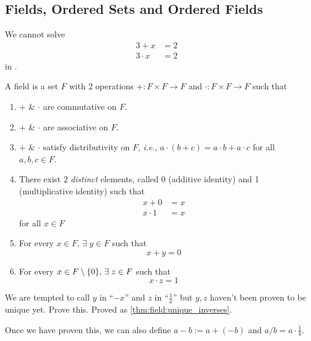 \subsection{Fields, Ordered Sets and Ordered Fields}
We cannot solve
\begin{align*}
    3 + x &= 2 \\
    3 \cdot x &= 2
\end{align*}
\hfill in \N.

\begin{defn} \label{defn:field}
    A field is a set $F$ with 2 operations $+ : F \times F \to F$ and $\cdot : F \times F \to F$ such that
    \begin{enumerate}[label=(F\arabic*)]
        \item \label{defn:field:commutativity}
            $+$ \& $\cdot$ are commutative on $F$.
        \item \label{defn:field:associativity}
            $+$ \& $\cdot$ are associative on $F$.
        \item \label{defn:field:distributivity}
            $+$ \& $\cdot$ satisfy distributivity on $F$, \textit{i.e.}, $a \cdot (b + c) = a \cdot b + a \cdot c$ for all $a, b, c \in F$. 
        \item \label{defn:field:identity}
            There exist 2 \emph{distinct} elements, called 0 (additive identity) and 1 (multiplicative identity) such that
            \begin{align*}
                x + 0 &= x \\
                x \cdot 1 &= x
            \end{align*}
            for all $x \in F$
        \item \label{defn:field:negative}
            For every $x \in F, \,\exists\; y \in F$ such that \[
                x + y = 0
            \]
        \item \label{defn:field:reciprocal}
            For every $x \in F \setminus \set{0}, \,\exists\; z \in F$ such that \[
                x \cdot z = 1
            \]
    \end{enumerate}
\end{defn}
\begin{rem}
    We are tempted to call $y$ in  ``$-x$'' and $z$ in  ``$\frac{1}{x}$'' but $y, z$ haven't been proven to be unique yet.
    \textcolor{exercise}{Prove this}.
    \textcolor{solved}{Proved as \cref{thm:field:unique_inverses}}.

    Once we have proven this, we can also define $a - b := a + (-b)$ and $a/b = a \cdot \frac{1}{b}$.
\end{rem}

